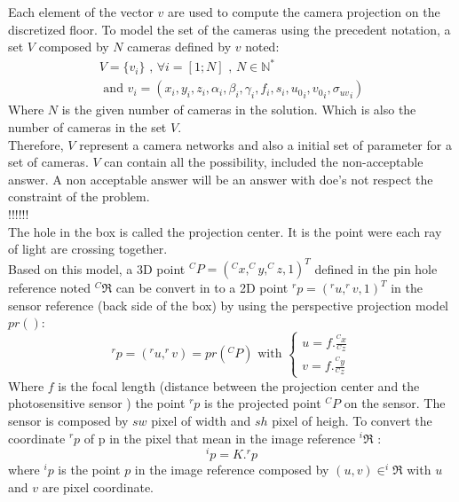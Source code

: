 Each element of the vector $v$ are used to compute the camera projection on the discretized floor. 
\iffalse 
To model the set of the cameras using the precedent notation, a set $V$ composed by $N$ cameras defined by $v$ noted:
\begin{equation}\label{eq:V}
\begin{split}
V= \{v_i\} \mbox{  , } \forall i=[1;N] \mbox{ , } N\in \mathbb{N}^*
\\
\mbox{ and } v_i= (x_i,y_i,z_i,\alpha_i ,\beta_i,\gamma_i,f_i,s_i,{u_0}_i,{v_0}_i,{\sigma_{uv}}_i)
\end{split}
\end{equation}
\noindent Where $N$ is the given number of cameras in the solution. Which is also the number of cameras in the set $V$. \\
Therefore, $V$ represent a camera networks and also a initial set of parameter for a set of cameras. $V$ can contain all the possibility, included the non-acceptable answer. A non acceptable  answer will be an answer with  doe's not respect the constraint of the problem.   
 \\ !!!!!!\\

  
 
    
The hole in the box is called the projection center. It is the point were each ray of light are crossing together.  \\
Based on this model, a 3D point $^CP=(^Cx,^Cy,^Cz,1)^T$ defined in the pin hole reference noted $ ^C\Re$ can be convert in to a 2D point  $^rp=(^ru,^rv,1)^T$ in the sensor reference (back side of the box) by using  the perspective projection model $pr() $: 
\begin{equation}
^rp=(^ru,^rv)= pr(^CP) \mbox{ with } \begin{cases} u= f.\frac{^Cx}{^Cz} \\  v= f.\frac{^Cy}{^Cz} 
\end{cases} 
\end{equation}
Where $f$ is the focal length (distance between the projection center and the photosensitive sensor )
the point $^rp$ is the projected point $^CP$ on the sensor. The sensor is composed by $sw$ pixel of width and $sh$  pixel of  heigh. To convert the coordinate $^rp$ of p in the pixel  that mean in the image reference $^i\Re$ : 
\begin{equation}
^ip=K. ^rp
\end{equation}
where $^ip$  is the point $p$ in the image reference composed by $(u,v) \in ^i\Re$ with $u$ and $v$ are  pixel coordinate. 


